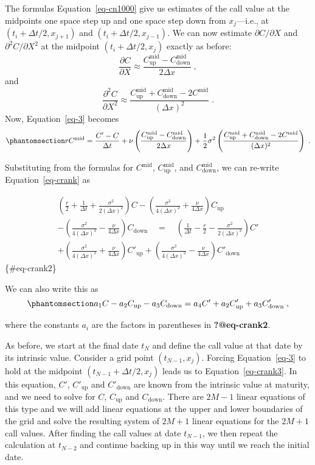 \documentclass[
  letterpaper,
  DIV=11,
  numbers=noendperiod]{scrartcl}
\theoremstyle{definition}
\theoremstyle{remark}
\begin{document}
The formulas Equation~\ref{eq-cn1000} give us estimates of the call
value at the midpoints one space step up and one space step down from
\(x_j\)---i.e., at \((t_i+\Delta t/2,x_{j+1})\) and
\((t_i+\Delta t/2,x_{j-1})\). We can now estimate
\(\partial C/\partial X\) and \(\partial^2 C/\partial X^2\) at the
midpoint \((t_i+\Delta t/2,x_j)\) exactly as before: \[
\frac{\partial C}{\partial X} \approx \frac{C^{\text{mid}}_{\text{up}}-C^{\text{mid}}_{\text{down}}}{2\Delta x}\;,
\] and \[
\frac{\partial^2 C}{\partial X^2} \approx \frac{C^{\text{mid}}_{\text{up}}+C^{\text{mid}}_{\text{down}}-2C^{\text{mid}}}{(\Delta x)^2}\;.
\] Now, Equation~\ref{eq-3} becomes
\begin{equation}\phantomsection\label{eq-crank}{
rC^{\text{mid}} = \frac{C'-C}{\Delta t}+ \nu\left(\frac{C^{\text{mid}}_{\text{up}}-C^{\text{mid}}_{\text{down}}}{2\Delta x}\right)+ \frac{1}{2}\sigma^2\left(\frac{C^{\text{mid}}_{\text{up}}+C^{\text{mid}}_{\text{down}}-2C^{\text{mid}}}{(\Delta x)^2}\right)\;.
}\end{equation}

Substituting from the formulas for \(C^{\text{mid}}\),
\(C^{\text{mid}}_{\text{up}}\), and \(C^{\text{mid}}_{\text{down}}\), we
can re-write Equation~\ref{eq-crank} as

\begin{multline}
\left(\frac{r}{2}+\frac{1}{\Delta t}+\frac{\sigma^2}{2(\Delta x)^2}\right)C - \left(\frac{\sigma^2}{4(\Delta x)^2}+\frac{\nu}{4\Delta x}\right)C_{\text{up}}\\ - \left(\frac{\sigma^2}{4(\Delta x)^2}-\frac{\nu}{4\Delta x}\right)C_{\text{down}} 
\quad = \quad \left(\frac{1}{\Delta t}- \frac{r}{2}-\frac{\sigma^2}{2(\Delta x)^2}\right)C' \\+ \left(\frac{\sigma^2}{4(\Delta x)^2}+\frac{\nu}{4\Delta x}\right)C'_{\text{up}} + \left(\frac{\sigma^2}{4(\Delta x)^2}-\frac{\nu}{4\Delta x}\right)C'_{\text{down}}
\end{multline} \{\#eq-crank2\}

We can also write this as
\begin{equation}\phantomsection\label{eq-crank3}{
a_1C - a_2C_{\text{up}} - a_3C_{\text{down}} 
= a_4C' + a_2C'_{\text{up}} + a_3C'_{\text{down}}\;,}\end{equation}

where the constants \(a_i\) are the factors in parentheses in
\textbf{?@eq-crank2}.

As before, we start at the final date \(t_N\) and define the call value
at that date by its intrinsic value. Consider a grid point
\((t_{N-1},x_j)\). Forcing Equation~\ref{eq-3} to hold at the midpoint
\((t_{N-1}+\Delta t/2,x_j)\) leads us to Equation~\ref{eq-crank3}. In
this equation, \(C'\), \(C'_{\text{up}}\) and \(C'_{\text{down}}\) are
known from the intrinsic value at maturity, and we need to solve for
\(C\), \(C_{\text{up}}\) and \(C_{\text{down}}\). There are \(2M-1\)
linear equations of this type and we will add linear equations at the
upper and lower boundaries of the grid and solve the resulting system of
\(2M+1\) linear equations for the \(2M+1\) call values. After finding
the call values at date \(t_{N-1}\), we then repeat the calculation at
\(t_{N-2}\) and continue backing up in this way until we reach the
initial date.
\end{document}
